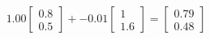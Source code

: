 \documentclass[preview]{standalone}
\begin{document}
\begin{align*}
1.00 \begin{bmatrix} 0.8 \\ 0.5 \end{bmatrix} + -0.01 \begin{bmatrix} 1 \\ 1.6 \end{bmatrix} = \begin{bmatrix} 0.79 \\ 0.48 \end{bmatrix}
\end{align*}
\end{document}
